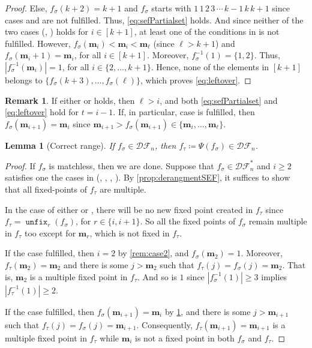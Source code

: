 \documentclass[reqno]{amsart}
\newtheorem{lemma}[theorem]{Lemma}
\theoremstyle{definition}
\newtheorem{remark}[theorem]{Remark}
\newcommand{\DSEF}{\mathcal{DF}}%
\newcommand{\fretherD}{\Psi}
\newcommand{\img}{\mathbf{m}}
\DeclareMathOperator{\unfixMap}{\mathtt{unfix}}
\begin{document}
\begin{proof}
Else, $f_\sigma(k+2)=k+1$ and $f_\sigma$ starts with 
$1\,1\,2\,3\,\dotsm\,k{-}1\,k\,k{+}1$ since cases 
\caseOne[k+2] and \caseTwo[k+2] are not fulfilled. Thus, \eqref{eq:sefPartialset} holds. And since 
neither of the two cases (\caseThree[i], 
\caseFour[i]) holds for $i\in[k+1]$, at least 
one of the conditions in 
\eqCond[i] is not 
fulfilled. However, 
$f_\sigma(\img_i)<\img_i<\img_\ell$ (since $\ell>k+1$) and 
$f_\sigma(\img_i+1)=\img_i$, for all 
$i\in[k+1]$. Moreover, 
$f^{-1}_\sigma(1)=\{1,2\}$. Thus, 
$|f^{-1}_\sigma(\img_i)|=1$, for all 
$i\in\{2,\dotsc,k+1\}$. Hence, none of the elements in $[k+1]$ 
belongs to 
$\{f_\sigma(k+3),\dotsc,f_\sigma(\ell)\}$, which proves \eqref{eq:leftover}.
\end{proof}

\begin{remark}\label{rem:casefour}
If either \caseThree[i] or \caseFour[i] holds, then $\ell>i$, and both
\eqref{eq:sefPartialset} and 
\eqref{eq:leftover} hold for $t=i-1$. If, in 
particular, case \caseFour[i] is fulfilled, then 
$f_{\sigma}(\img_{i+1})=\img_i$ since 
$\img_{i+1}>f_{\sigma}(\img_{i+1})\in\{\img_{i},\dotsc,\img_{\ell}\}$.
\end{remark}


\begin{lemma}[Correct range]\label{lem:correctRange}
If $f_{\sigma}\in \DSEF_n$, then $f_\tau \coloneqq\fretherD(f_{\sigma})\in \DSEF_n$.
\end{lemma}
\begin{proof}
	If $f_\sigma$ is matchless, then we are done. 
	Suppose that $f_{\sigma}\in \DSEF^*_n$ and $i\geq 2$ satisfies one the cases in (\caseOne[i], \caseTwo[i], \caseThree[i], \caseFour[i]).
By \cref{prop:derangmentSEF}, it suffices to show that all fixed-points of $f_\tau$ are multiple.
\medskip

In the case of either \caseOne[i] or \caseThree[i], there will be no new fixed point created in $f_\tau$ since $f_\tau=\unfixMap_r(f_\sigma)$, for $r\in\{i,i+1\}$. So all the fixed points of $f_\sigma$ remain multiple in $f_\tau$ too except for $\img_r$, which is not fixed in $f_\tau$.
\medskip

If the case \caseTwo[i] fulfilled, then $i=2$ by \cref{rem:case2}, and $f_\sigma(\img_2)=1$. Moreover,
$f_{\tau}(\img_2)=\img_{2}$ and there is some $j>\img_2$ such 
that $f_{\tau}(j)=f_{\sigma}(j)=\img_{2}$. That is, 
$\img_2$ is a multiple fixed point in $f_{\tau}$. And so is $1$ since $|f^{-1}_\sigma(1)|\geq 3$ implies $|f^{-1}_\tau(1)|\geq 2$.
\medskip

If the case \caseFour[i] fulfilled, then $f_{\sigma}(\img_{i+1})=\img_i$ by \cref{rem:casefour},
and there is some $j>\img_{i+1}$ such that $f_{\tau}(j)=f_{\sigma}(j)=\img_{i+1}$.
Consequently, $f_{\tau}(\img_{i+1})=\img_{i+1}$ is a multiple fixed point in $f_{\tau}$ while $\img_i$ is not a fixed point in both $f_\sigma$ and $f_\tau$.
\end{proof}
\end{document}
